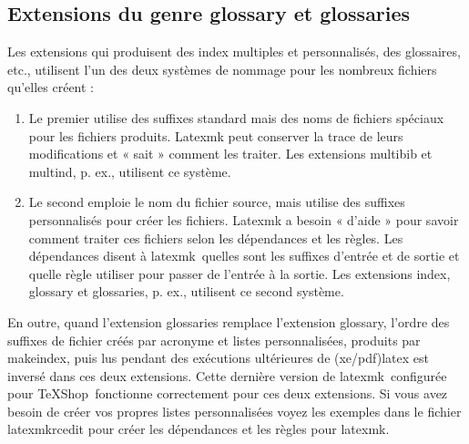 \documentclass[11pt,french]{article}
\newcommand{\TS}{\textsf{\TeX Shop}}
\newcommand{\latexmk}{\textsf{latexmk}}
\newcommand{\cmd}[1]{\textsf{#1}}
\begin{document}
\subsection{Extensions du genre \cmd{glossary} et \cmd{glossaries}}

Les extensions qui produisent des index multiples et personnalisés, des glossaires, etc., utilisent l'un des deux systèmes de nommage pour les nombreux fichiers qu'elles créent :
\begin{enumerate}
\item 
Le premier utilise des suffixes standard mais des noms de fichiers spéciaux pour les fichiers produits. \cmd{Latexmk} peut conserver la trace de leurs modifications et « sait » comment les traiter. Les extensions \cmd{multibib} et \cmd{multind}, p. ex., utilisent ce système.
\item 
Le second emploie le nom du fichier source, mais utilise des suffixes personnalisés pour créer les fichiers. \cmd{Latexmk} a besoin « d'aide » pour savoir comment traiter ces fichiers selon les dépendances et les règles. Les dépendances disent à \latexmk\ quelles sont les suffixes d'entrée et de sortie et quelle règle utiliser pour passer de l'entrée à la sortie. Les extensions \cmd{index}, \cmd{glossary} et \cmd{glossaries}, p. ex., utilisent ce second système.
\end{enumerate}

En outre, quand l'extension \cmd{glossaries} remplace l'extension \cmd{glossary}, l'ordre des suffixes de fichier créés par acronyme et listes personnalisées, produits par \cmd{makeindex}, puis lus pendant des exécutions ultérieures de (\cmd{xe/pdf)latex} est inversé dans ces deux extensions. Cette dernière version de \latexmk\ configurée pour \TS\ fonctionne correctement pour ces deux extensions. Si vous avez besoin de créer vos propres listes personnalisées voyez les exemples dans le fichier \cmd{latexmkrcedit} pour créer les dépendances et les règles pour \latexmk.%
\end{document}
